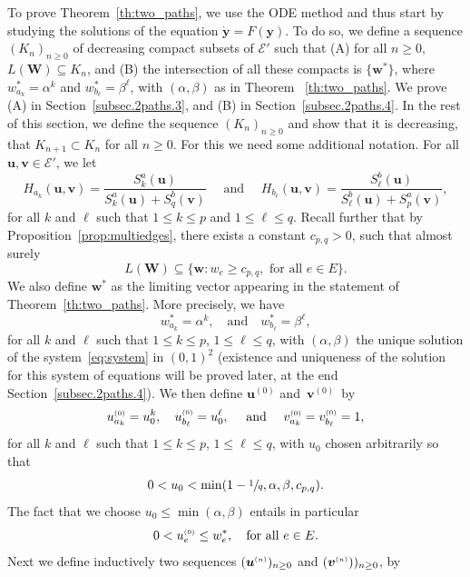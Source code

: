\documentclass[JEP,XML,SOM,Unicode,NoFloatCountersInSection,published]{cedram}
\let\mathcal\mathscr
\let \nicefrac\sfrac
\newcommand{\bW}{\boldsymbol{W}}
\numberwithin{equation}{section}
\theoremstyle{definition}
\let\bs\boldsymbol
\newcommand{\sss}{\ensuremath{\scriptscriptstyle}}
\begin{document}
To prove Theorem~\ref{th:two_paths}, we use the ODE method and thus start by studying the solutions of the equation ${\bs{\dot y}} =F({\bs y})$. To do so, we define a sequence $(K_n)_{n\geq 0}$ of decreasing compact subsets of $\mathcal E'$ such that (A) for all $n\geq 0$, $L(\bW)\subseteq K_n$, and (B) the intersection of all these compacts is $\{\bs w^*\}$, where $w_{a_k}^* = \alpha^k$ and $w_{b_\ell}^* = \beta^\ell$, with $(\alpha, \beta)$ as in Theorem ~\ref{th:two_paths}.
We prove (A) in Section~\eqref{subsec.2paths.3}, and (B) in Section~\ref{subsec.2paths.4}.
In the rest of this section, we define the sequence $(K_n)_{n\geq 0}$ and show that it is decreasing,
\ie that $K_{n+1} \subset K_n$ for all $n\ge 0$.
For this we need some additional notation.
For all $\bs u,\bs v \in \mathcal E'$, we let
\[
H_{a_k}(\bs u,\bs v)
= \frac{S^a_k(\bs u)}{S^a_k(\bs u)+S^b_q(\bs v)}
\quad\text{ and }\quad
H_{b_\ell}(\bs u,\bs v)
= \frac{S^b_\ell(\bs u)}{S^b_\ell(\bs u)+S^a_p(\bs v)},
\]
for all $k$ and $\ell$ such that $1\leq k\leq p$ and $1\leq \ell\leq q$.
Recall further that by Proposition~\ref{prop:multiedges}, there exists a constant $c_{p,q}>0$, such that almost surely
\begin{equation}\label{K0def}
L(\bW) \subseteq \{\bs w\colon w_e\ge c_{p,q}, \text{ for all }e\in E\}.
\end{equation}
{We also define $\bs w^*$ as the limiting vector appearing in the statement of Theorem~\ref{th:two_paths}. More precisely, we have }
\begin{equation}\label{w*}
{w_{a_k}^* = \alpha^k, \quad \text{and} \quad w_{b_\ell}^* = \beta^\ell,}
\end{equation}
{for all $k$ and $\ell$ such that  $1\le k\le p$, $1\le \ell \le q$, with $(\alpha,\beta)$ the unique solution of the system~\eqref{eq:system} in $(0,1)^2$ (existence and {uniqueness} of the solution for this system of equations will be proved later, at the end Section~\ref{subsec.2paths.4}).}
We then define $\bs u^{(0)}$ and~$\bs v^{(0)}$~by
\[
u^{\sss (0)}_{a_k}=u_0^k, \quad
u^{\sss (0)}_{b_\ell}=u_0^\ell,\quad \text{ and }\quad
v^{\sss (0)}_{a_k}=v^{\sss (0)}_{b_\ell}=1,
\]
for all $k$ and $\ell$ such that  $1\le k\le p$, $1\le \ell \le q$, with $u_0$ chosen arbitrarily so that
\[
0< u_0<\min(1-\nicefrac1q,\alpha,\beta,c_{p,q}).
\]
The fact that we choose $u_0\le \min(\alpha,\beta)$ entails in particular
\[
0< u^{\sss (0)}_e\leq w^*_e, \quad \text{for all }e\in E.
\]
Next we define inductively two sequences $(\bs u^{\sss (n)})_{n\ge 0}$ and $(\bs v^{\sss (n)}))_{n\ge 0}$, by
\end{document}
